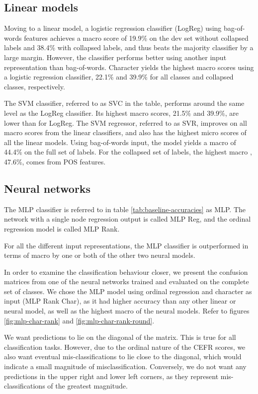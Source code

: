 \subsection{Linear models}

Moving to a linear model, a logistic regression classifier (LogReg) using
bag-of-words features achieves a macro \FI score of 19.9\% on the dev set
without collapsed labels and 38.4\% with collapsed labels, and thus beats the
majority classifier by a large margin. However, the classifier performs
better using another input representation than bag-of-words. Character
\ngrams yields the highest macro \FI scores using a logistic regression
classifier, 22.1\% and 39.9\% for all classes and collapsed classes,
respectively.

The \ac{SVM} classifier, referred to as SVC in the table, performs around the
same level as the LogReg classifier. Its highest macro \FI scores, 21.5\% and
39.9\%, are lower than for LogReg. The \ac{SVM} regressor, referred to as
SVR, improves on all macro \FI scores from the linear classifiers, and also
has the highest micro \FI scores of all the linear models. Using bag-of-words
input, the model yields a macro \FI of 44.4\% on the full set of labels. For
the collapsed set of labels, the highest macro \FI, 47.6\%, comes from POS
\ngram features.


\subsection{Neural networks}

The \ac{MLP} classifier is referred to in table \ref{tab:baseline-accuracies}
as MLP. The network with a single node regression output is called MLP Reg,
and the ordinal regression model is called MLP Rank.

For all the different input representations, the \ac{MLP} classifier is
outperformed in terms of macro \FI by one or both of the other two neural
models.

In order to examine the classification behaviour closer, we present the
confusion matrices from one of the neural networks trained and evaluated on
the complete set of classes. We chose the MLP model using ordinal regression
and character \ngrams as input (MLP Rank Char), as it had higher accuracy
than any other linear or neural model, as well as the highest macro \FI of
the neural models. Refer to figures \ref{fig:mlp-char-rank} and
\ref{fig:mlp-char-rank-round}.

We want predictions to lie on the diagonal of the matrix. This is true for
all classification tasks. However, due to the ordinal nature of the CEFR
scores, we also want eventual mis-classifications to lie close to the
diagonal, which would indicate a small magnitude of misclassification.
Conversely, we do not want any predictions in the upper right and lower left
corners, as they represent mis-classifications of the greatest magnitude.

